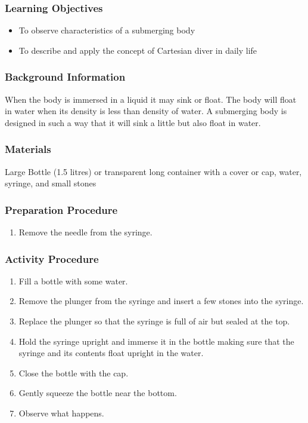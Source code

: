 \subsubsection*{Learning Objectives}
\begin{itemize}
\item{To observe characteristics of a submerging body}
\item{To describe and apply the concept of Cartesian diver in daily life}
\end{itemize}

\subsubsection*{Background Information}
When the body is immersed in a liquid it may sink or float. The body will float in water when its density is less than density of water. A submerging body is designed in such a way that it will sink a little but also float in water. 

\subsubsection*{Materials}
Large Bottle (1.5 litres) or transparent long container with a cover or cap, water, syringe, and small stones

\subsubsection*{Preparation Procedure}
\begin{enumerate}
\item{Remove the needle from the syringe.}
\end{enumerate}

\subsubsection*{Activity Procedure}
\begin{enumerate}
\item{Fill a bottle with some water.}
\item{Remove the plunger from the syringe and insert a few stones into the syringe.}
\item{Replace the plunger so that the syringe is full of air but sealed at the top.} 
\item{Hold the syringe upright and immerse it in the bottle making sure that the syringe and its contents float upright in the water.}
\item{Close the bottle with the cap.}
\item{Gently squeeze the bottle near the bottom.} 
\item{Observe what happens.}
\end{enumerate}

